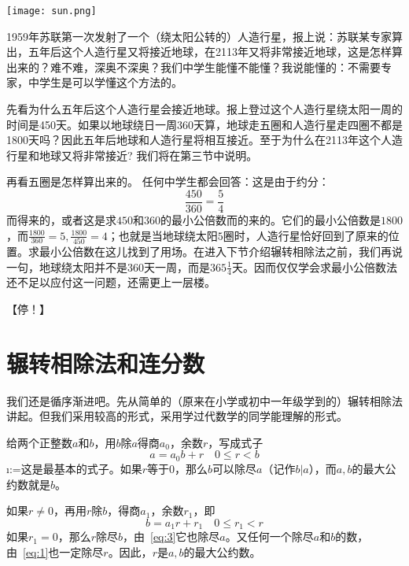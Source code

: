 \documentclass{ctexart}
\makeatletter
\newcommand{\cemph}[1]{\@tfor\i:=#1\do{\textsubdot{\i}}}
\makeatother
\begin{document}
\begin{paracol}{2} %
  \begin{leftcolumn}
  \texttt{[image: sun.png]}
  \end{leftcolumn}

\begin{rightcolumn}
  1959年苏联第一次发射了一个（绕太阳公转的）人造行星，报上说：苏联某专家算出，五年后这个人造行星又将接近地球，在2113年又将非常接近地球，这是怎样算出来的？难不难，深奥不深奥？我们中学生能懂不能懂？我说能懂的：不需要专家，中学生是可以学懂这个方法的。
\end{rightcolumn}

\end{paracol}

先看为什么五年后这个人造行星会接近地球。报上登过这个人造行星绕太阳一周的时间是450天。如果以地球绕日一周360天算，地球走五圈和人造行星走四圈不都是1800天吗？因此五年后地球和人造行星将相互接近。至于为什么在2113年这个人造行星和地球又将非常接近? 我们将在第三节中说明。

再看五圈是怎样算出来的。 任何中学生都会回答：这是由于约分：
\begin{equation*}
\frac{450}{360} = \frac{5}{4}
\end{equation*}
而得来的，或者这是求$450$和$360$的最小公倍数而的来的。它们的最小公倍数是$1800$，而$\frac{1800}{360} = 5, \frac{1800}{450} = 4$；也就是当地球绕太阳$5$圈时，人造行星恰好回到了原来的位置。求最小公倍数在这儿找到了用场。在进入下节介绍辗转相除法之前，我们再说一句，地球绕太阳并不是$360$天一周，而是$365 \frac{1}{4}$天。因而仅仅学会求最小公倍数法还不足以应付这一问题，还需更上一层楼。

【停！】
\section{辗转相除法和连分数}
我们还是循序渐进吧。先从简单的（原来在小学或初中一年级学到的）辗转相除法讲起。但我们采用较高的形式，采用学过代数学的同学能理解的形式。

给两个正整数$a$和$b$，用$b$除$a$得商$a_0$，余数$r$，写成式子
\begin{equation}
\label{eq:3}
a = a_0b + r \quad 0\le r < b
\end{equation}
\cemph{这是最基本的式子}。如果$r$等于$0$，那么$b$可以除尽$a$（记作$b|a$），而$a,b$的最大公约数就是$b$。

如果$r\ne 0$，再用$r$除$b$，得商$a_1$，余数$r_1$，即
\begin{equation}
\label{eq:1}
b = a_1 r + r_1 \quad 0\le r_1<r
\end{equation}
如果$r_1 = 0$，那么$r$除尽$b$，由~\eqref{eq:3}它也除尽$a$。又任何一个除尽$a$和$b$的数，由~\eqref{eq:1}也一定除尽$r$。因此，$r$是$a,b$的最大公约数。
\end{document}
